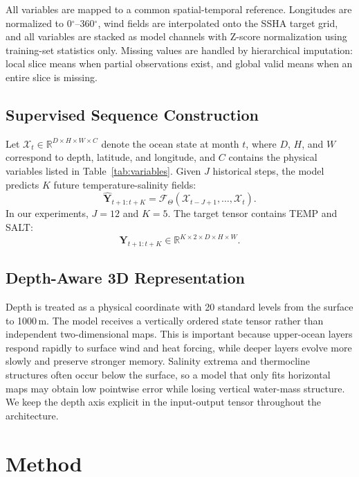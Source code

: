 \documentclass[conference]{IEEEtran}
\begin{document}
All variables are mapped to a common spatial-temporal reference. Longitudes are normalized to 0$^\circ$--360$^\circ$, wind fields are interpolated onto the SSHA target grid, and all variables are stacked as model channels with Z-score normalization using training-set statistics only. Missing values are handled by hierarchical imputation: local slice means when partial observations exist, and global valid means when an entire slice is missing.

\subsection{Supervised Sequence Construction}

Let $\mathcal{X}_t \in \mathbb{R}^{D \times H \times W \times C}$ denote the ocean state at month $t$, where $D$, $H$, and $W$ correspond to depth, latitude, and longitude, and $C$ contains the physical variables listed in Table~\ref{tab:variables}. Given $J$ historical steps, the model predicts $K$ future temperature-salinity fields:
\begin{equation}
\hat{\mathbf{Y}}_{t+1:t+K} =
\mathcal{F}_{\Theta}(\mathcal{X}_{t-J+1}, \ldots, \mathcal{X}_{t}).
\end{equation}
In our experiments, $J=12$ and $K=5$. The target tensor contains TEMP and SALT:
\begin{equation}
\mathbf{Y}_{t+1:t+K} \in \mathbb{R}^{K \times 2 \times D \times H \times W}.
\end{equation}

\subsection{Depth-Aware 3D Representation}

Depth is treated as a physical coordinate with 20 standard levels from the surface to 1000\,m. The model receives a vertically ordered state tensor rather than independent two-dimensional maps. This is important because upper-ocean layers respond rapidly to surface wind and heat forcing, while deeper layers evolve more slowly and preserve stronger memory. Salinity extrema and thermocline structures often occur below the surface, so a model that only fits horizontal maps may obtain low pointwise error while losing vertical water-mass structure. We keep the depth axis explicit in the input-output tensor throughout the architecture.

\section{Method}
\end{document}
